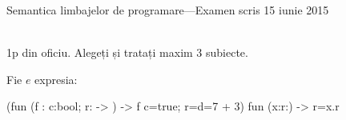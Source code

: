 \documentclass[addpoints,12pt,a4paper,answers]{exam}
\newcommand{\getHeight}[1]{%
#1%
}
\newenvironment{solutie}{\par\hspace*{-9em}\begin{minipage}{.98\paperwidth}
\hrulefill {\bf Rezolvare} \hrulefill}{\hrulefill\end{minipage}}
\begin{document}
\begin{center}


Semantica limbajelor de programare---Examen scris \hfill  15 iunie 2015 \\ \ \\

\end{center}


1p din oficiu.  Alegeți și tratați maxim 3 subiecte.


\begin{questions}

Fie $e$ expresia:
\begin{asciiml}
(fun (f : {c:bool; r:{}} -> {}) ->  f {c=true; r={d=7 + 3}}) fun (x:{r:{}}) ->  {r=x.r}
\end{asciiml}

\begin{parts}


%
%


\end{parts}
\end{questions}
\end{document}
